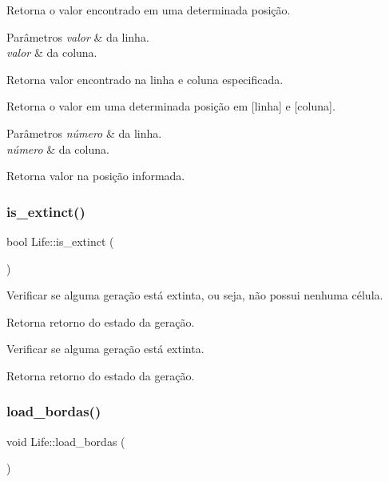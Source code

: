 Retorna o valor encontrado em uma determinada posição. 
\begin{DoxyParams}{Parâmetros}
{\em valor} & da linha. \\
\hline
{\em valor} & da coluna. \\
\hline
\end{DoxyParams}
\begin{DoxyReturn}{Retorna}
valor encontrado na linha e coluna especificada.
\end{DoxyReturn}
Retorna o valor em uma determinada posição em \mbox{[}linha\mbox{]} e \mbox{[}coluna\mbox{]}. 
\begin{DoxyParams}{Parâmetros}
{\em número} & da linha. \\
\hline
{\em número} & da coluna. \\
\hline
\end{DoxyParams}
\begin{DoxyReturn}{Retorna}
valor na posição informada. 
\end{DoxyReturn}
\mbox{\label{classLife_a7b7cd244c2ce5b7d6ed0db9a188b2256}} 
\subsubsection{\texorpdfstring{is\+\_\+extinct()}{is\_extinct()}}
{\footnotesize\ttfamily bool Life\+::is\+\_\+extinct (\begin{DoxyParamCaption}{ }\end{DoxyParamCaption})}

Verificar se alguma geração está extinta, ou seja, não possui nenhuma célula. \begin{DoxyReturn}{Retorna}
retorno do estado da geração.
\end{DoxyReturn}
Verificar se alguma geração está extinta. \begin{DoxyReturn}{Retorna}
retorno do estado da geração. 
\end{DoxyReturn}
\mbox{\label{classLife_a8cc497d4d07aa0d9b6b31faa14f0e12f}} 
\subsubsection{\texorpdfstring{load\+\_\+bordas()}{load\_bordas()}}
{\footnotesize\ttfamily void Life\+::load\+\_\+bordas (\begin{DoxyParamCaption}{ }\end{DoxyParamCaption})}



